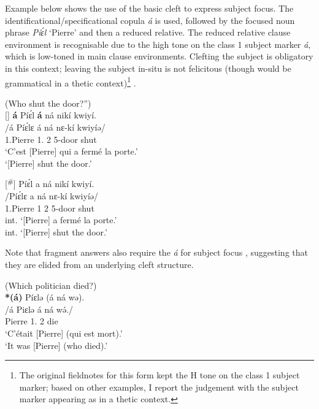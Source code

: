 \documentclass[output=paper,colorlinks,citecolor=brown
]{langscibook}
\begin{document}
Example  below shows the use of the basic cleft to express subject focus. The identificational/specificational copula \textit{á} is used, followed by the focused noun phrase \textit{Píɛ́l} `Pierre' and then a reduced relative. The reduced relative clause environment is recognisable due to the high tone on the class 1 subject marker \textit{á}, which is low-toned in main clause environments. Clefting the subject is obligatory in this context; leaving the subject in-situ is not felicitous (though would be grammatical in a thetic context)\footnote{The original fieldnotes for this form kept the H tone on the class 1 subject marker; based on other examples, I report the judgement with the subject marker appearing as in a thetic context.} .

\largerpage[-1]
\pagebreak
\ea \label{subjfocuswhoshutdoor} (Who shut the door?'') \\ 
\ea
[]{
\glll
{\db}\textbf{á} Píɛ́l \textbf{á} ná nikí kwiyí. \\
/á Píɛ́lɛ á ná nɛ-kí kwiyíə/ \\
{\db}\COP{} 1.Pierre 1\SM{}.\REL{} \PST{}2{} 5-door shut \\
\glt
`C'est [Pierre]\textsubscript{\FOC{}} qui a fermé la porte.' \\ `[Pierre]\textsubscript{\FOC{}} shut the door.' \jambox*{[EO 273]}
}

\ex
[\textsuperscript{$\#$}]{
\label{subjfocuswhoshutdoorbad}
\glll
{\db}Píɛ́l a ná nikí kwiyí. \\
/Píɛ́lɛ a ná nɛ-kí kwiyíə/ \\
{\db}1.Pierre 1\SM{} \PST{}2{} 5-door shut \\
\glt
int. `[Pierre]\textsubscript{\FOC{}} a fermé la porte.' \\ int. `[Pierre]\textsubscript{\FOC{}} shut the door.' \jambox*{[EO 277] }
}

\z
\z

Note that fragment answers also require the \textit{á} for subject focus , suggesting that they are elided from an underlying cleft structure.

\ea
\label{ex:whichpoldiefrag}
(Which politician died?) \\ 
\glll
{\db}\textbf{*(á)} Píɛlə (á ná wə). \\
/á Piɛlə á ná wə́./ \\
{\db}\COP{} Pierre 1\SM{}.\REL{} \PST{}2{} die \\
\glt
`C'était [Pierre]\textsubscript{\FOC{}} (qui est mort).' \\`It was [Pierre]\textsubscript{\FOC{}} (who died).' \jambox*{[EO 270--1] }
\end{document}
